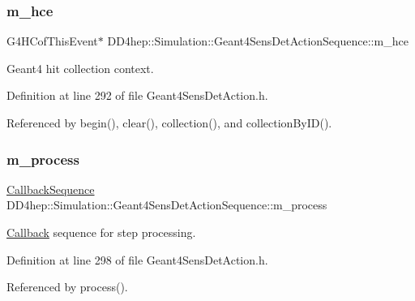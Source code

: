 \subsubsection{\texorpdfstring{m\+\_\+hce}{m\_hce}}
{\footnotesize\ttfamily G4\+H\+Cof\+This\+Event$\ast$ D\+D4hep\+::\+Simulation\+::\+Geant4\+Sens\+Det\+Action\+Sequence\+::m\+\_\+hce\hspace{0.3cm}{\ttfamily [protected]}}



Geant4 hit collection context. 



Definition at line 292 of file Geant4\+Sens\+Det\+Action.\+h.



Referenced by begin(), clear(), collection(), and collection\+By\+I\+D().

\hypertarget{class_d_d4hep_1_1_simulation_1_1_geant4_sens_det_action_sequence_a2ebfed15148432bab44c58ce3c7a0a95}{}\label{class_d_d4hep_1_1_simulation_1_1_geant4_sens_det_action_sequence_a2ebfed15148432bab44c58ce3c7a0a95} 
\subsubsection{\texorpdfstring{m\+\_\+process}{m\_process}}
{\footnotesize\ttfamily \hyperlink{struct_d_d4hep_1_1_callback_sequence}{Callback\+Sequence} D\+D4hep\+::\+Simulation\+::\+Geant4\+Sens\+Det\+Action\+Sequence\+::m\+\_\+process\hspace{0.3cm}{\ttfamily [protected]}}



\hyperlink{class_d_d4hep_1_1_callback}{Callback} sequence for step processing. 



Definition at line 298 of file Geant4\+Sens\+Det\+Action.\+h.



Referenced by process().

\hypertarget{class_d_d4hep_1_1_simulation_1_1_geant4_sens_det_action_sequence_a480029ca979ac872688986da731930b8}{}\label{class_d_d4hep_1_1_simulation_1_1_geant4_sens_det_action_sequence_a480029ca979ac872688986da731930b8} 
